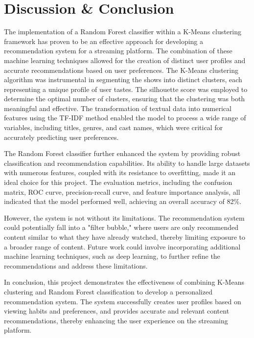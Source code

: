\documentclass[sigconf]{acmart}
\begin{document}
	\section{Discussion \& Conclusion}
	The implementation of a Random Forest classifier within a K-Means clustering framework has proven to be an effective approach for developing a recommendation system for a streaming platform. The combination of these machine learning techniques allowed for the creation of distinct user profiles and accurate recommendations based on user preferences.
	The K-Means clustering algorithm was instrumental in segmenting the shows into distinct clusters, each representing a unique profile of user tastes. The silhouette score was employed to determine the optimal number of clusters, ensuring that the clustering was both meaningful and effective. The transformation of textual data into numerical features using the TF-IDF method enabled the model to process a wide range of variables, including titles, genres, and cast names, which were critical for accurately predicting user preferences.
	
	The Random Forest classifier further enhanced the system by providing robust classification and recommendation capabilities. Its ability to handle large datasets with numerous features, coupled with its resistance to overfitting, made it an ideal choice for this project. The evaluation metrics, including the confusion matrix, ROC curve, precision-recall curve, and feature importance analysis, all indicated that the model performed well, achieving an overall accuracy of 82\%.
	
	However, the system is not without its limitations. The recommendation system could potentially fall into a "filter bubble," where users are only recommended content similar to what they have already watched, thereby limiting exposure to a broader range of content. Future work could involve incorporating additional machine learning techniques, such as deep learning, to further refine the recommendations and address these limitations.
	
	In conclusion, this project demonstrates the effectiveness of combining K-Means clustering and Random Forest classification to develop a personalized recommendation system. The system successfully creates user profiles based on viewing habits and preferences, and provides accurate and relevant content recommendations, thereby enhancing the user experience on the streaming platform.
\end{document}
